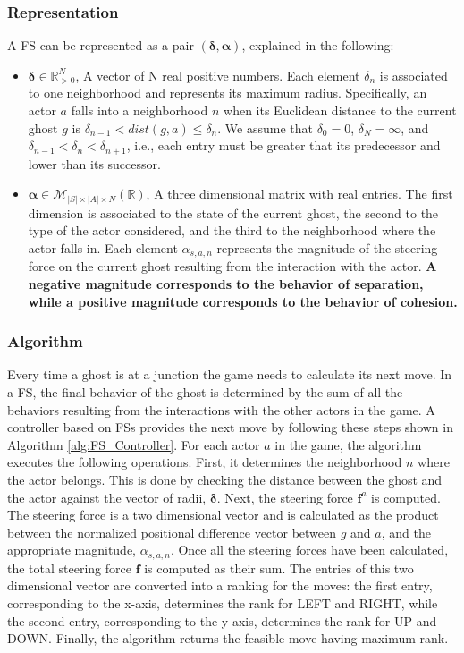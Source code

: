 \documentclass[journal]{IEEEtran}
\begin{document}
\subsubsection{Representation}
A FS can be represented as a pair $(\boldsymbol\delta, \boldsymbol\alpha)$, explained in the following:
\begin{itemize}
  \item $\boldsymbol\delta \in \mathbb{R}_{>0}^N$, A vector of N real positive numbers. Each element $\delta_n$ is associated to one neighborhood and represents its maximum radius. Specifically, an actor $a$ falls into a neighborhood $n$ when its Euclidean distance to the current ghost $g$ is $\delta_{n-1} < dist(g,a) \leq \delta_n$. We assume that $\delta_0 = 0$, $\delta_N = \infty$, and $\delta_{n-1} < \delta_n < \delta_{n+1}$, i.e., each entry must be greater that its predecessor and lower than its successor.
  \item $\boldsymbol\alpha \in \mathcal{M}_{|S| \times |A| \times N}(\mathbb{R})$, A three dimensional matrix with real entries. The first dimension is associated to the state of the current ghost, the second to the type of the actor considered, and the third to the neighborhood where the actor falls in. Each element $\alpha_{s,a,n}$ represents the magnitude of the steering force on the current ghost resulting from the interaction with the actor. \textbf{A negative magnitude corresponds to the behavior of separation, while a positive magnitude corresponds to the behavior of cohesion.}
\end{itemize}

\subsubsection{Algorithm}
Every time a ghost is at a junction the game needs to calculate its next move. In a FS, the final behavior of the ghost is determined by the sum of all the behaviors resulting from the interactions with the other actors in the game. A controller based on FSs provides the next move by following these steps shown in Algorithm \ref{alg:FS_Controller}. For each actor $a$ in the game, the algorithm executes the following operations. First, it determines the neighborhood $n$ where the actor belongs. This is done by checking the distance between the ghost and the actor against the vector of radii, $\boldsymbol\delta$. Next, the steering force $\mathbf{f}^a$ is computed. The steering force is a two dimensional vector and is calculated as the product between the normalized positional difference vector between $g$ and $a$, and the appropriate magnitude, $\alpha_{s,a,n}$. Once all the steering forces have been calculated, the total steering force $\mathbf{f}$ is computed as their sum. The entries of this two dimensional vector are converted into a ranking for the moves: the first entry, corresponding to the x-axis, determines the rank for LEFT and RIGHT, while the second entry, corresponding to the y-axis, determines the rank for UP and DOWN. Finally, the algorithm returns the feasible move having maximum rank.
\end{document}
